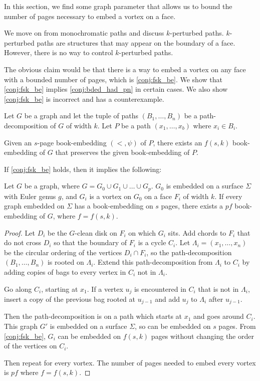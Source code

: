 
In this section, we find some graph parameter that allows us to bound the number of pages necessary to embed a vortex on a face.

We move on from monochromatic paths and discuss $k$-perturbed paths. $k$-perturbed paths are structures that may appear on the boundary of a face. However, there is no way to control $k$-perturbed paths. 

The obvious claim would be that there is a way to embed a vortex on any face with a bounded number of pages, which is \cref{conj:fsk_be}. We show that \cref{conj:fsk_be} implies \cref{conj:bded_had_pn} in certain cases. We also show \cref{conj:fsk_be} is incorrect and has a counterexample.
\begin{claim}\label{conj:fsk_be}
	Let $G$ be a graph and let the tuple of paths $(B_1, \ldots, B_n)$ be a path-decomposition of $G$ of width $k$. Let $P$ be a path $(x_1, \ldots, x_b)$ where $x_i \in B_i$. 

	Given an $s$-page book-embedding $(<, \psi)$ of $P$, there exists an $f(s, k)$ book-embedding of $G$ that preserves the given book-embedding of $P$.
\end{claim}

If \cref{conj:fsk_be} holds, then it implies the following:

\begin{corollary}\label{corr:fsk_be}
	Let $G$ be a graph, where $G = G_0 \cup G_1 \cup \ldots \cup G_p$. $G_0$ is embedded on a surface $\Sigma$ with Euler genus $g$, and $G_i$ is a vortex on $G_0$ on a face $F_i$ of width $k$. If every graph embedded on $\Sigma$ has a book-embedding on $s$ pages, there exists a $p f$ book-embedding of $G$, where $f = f(s, k)$.
\end{corollary}

\begin{proof}
	Let $D_i$ be the $G$-clean disk on $F_i$ on which $G_i$ sits. Add chords to $F_i$ that do not cross $D_i$ so that the boundary of $F_i$ is a cycle $C_i$. Let $\Lambda_i= (x_1, \ldots, x_n)$ be the circular ordering of the vertices $D_i \cap F_i$, so the path-decomposition $(B_1, \ldots , B_n)$ is rooted on $\Lambda_i$. Extend this path-decomposition from $\Lambda_i$ to $C_i$ by adding copies of bags to every vertex in $C_i$ not in $\Lambda_i$.

	Go along $C_i$, starting at $x_1$. If a vertex $u_j$ is encountered in $C_i$ that is not in $\Lambda_i$, insert a copy of the previous bag rooted at $u_{j-1}$ and add $u_j$ to $\Lambda_i$ after $u_{j-1}$.
	
	Then the path-decomposition is on a path which starts at $x_1$ and goes around $C_i$.  
	This graph $G'$ is embedded on a surface $\Sigma$, so can be embedded on $s$ pages. From \cref{conj:fsk_be}, $G_i$ can be embedded on $f(s, k)$ pages without changing the order of the vertices on $C_i$.

	Then repeat for every vortex. The number of pages needed to embed every vortex is $p f$ where $f = f(s, k)$. 
\end{proof}

